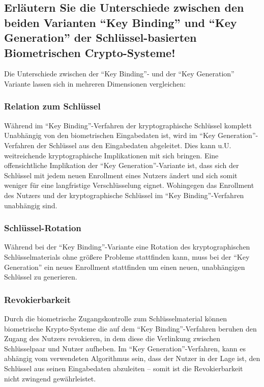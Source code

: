 \documentclass{article}
\begin{document}
\subsection{Erläutern Sie die Unterschiede zwischen den beiden Varianten ``Key Binding'' und ``Key Generation''
der Schlüssel-basierten Biometrischen Crypto-Systeme!}



Die Unterschiede zwischen der ``Key Binding''- und der ``Key Generation'' Variante lassen sich in mehreren Dimensionen vergleichen:

\subsubsection*{Relation zum Schlüssel}

Während im ``Key Binding''-Verfahren der kryptographische Schlüssel komplett Unabhängig von den biometrischen Eingabedaten ist, wird
im ``Key Generation''-Verfahren der Schlüssel aus den Eingabedaten abgeleitet. Dies kann u.U. weitreichende kryptographische 
Implikationen mit sich bringen. Eine offensichtliche Implikation der ``Key Generation''-Variante ist, dass sich der Schlüssel mit jedem 
neuen Enrollment eines Nutzers ändert und sich somit weniger für eine langfristige Verschlüsselung eignet. Wohingegen das Enrollment
des Nutzers und der kryptographische Schlüssel im ``Key Binding''-Verfahren unabhängig sind.

\subsubsection*{Schlüssel-Rotation}

Während bei der ``Key Binding''-Variante eine Rotation des kryptographischen Schlüsselmaterials ohne größere Probleme stattfinden kann,
muss bei der ``Key Generation'' ein neues Enrollment stattfinden um einen neuen, unabhängigen Schlüssel zu generieren.

\subsubsection*{Revokierbarkeit}

Durch die biometrische Zugangskontrolle zum Schlüsselmaterial können biometrische Krypto-Systeme die auf dem ``Key Binding''-Verfahren 
beruhen den Zugang des Nutzers revokieren, in dem diese die Verlinkung zwischen Schlüsselpaar und Nutzer aufheben. Im ``Key 
Generation''-Verfahren, kann es abhängig vom verwendeten Algorithmus sein, dass der Nutzer in der Lage ist, den Schlüssel aus seinen 
Eingabedaten abzuleiten – somit ist die Revokierbarkeit nicht zwingend gewährleistet.
\end{document}
